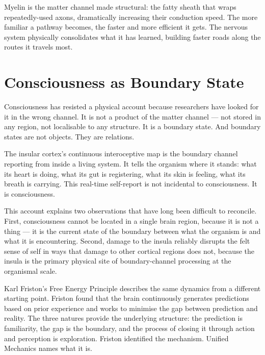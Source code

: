 \documentclass[12pt]{article}
\begin{document}
Myelin is the matter channel made structural: the fatty sheath that wraps
repeatedly-used axons, dramatically increasing their conduction speed. The more
familiar a pathway becomes, the faster and more efficient it gets. The nervous
system physically consolidates what it has learned, building faster roads along
the routes it travels most.

\section{Consciousness as Boundary State}

Consciousness has resisted a physical account because researchers have looked
for it in the wrong channel. It is not a product of the matter channel --- not
stored in any region, not localisable to any structure. It is a boundary state.
And boundary states are not objects. They are relations.

The insular cortex's continuous interoceptive map is the boundary channel
reporting from inside a living system. It tells the organism where it stands:
what its heart is doing, what its gut is registering, what its skin is feeling,
what its breath is carrying. This real-time self-report is not incidental to
consciousness. It is consciousness.

This account explains two observations that have long been difficult to reconcile.
First, consciousness cannot be located in a single brain region, because it is
not a thing --- it is the current state of the boundary between what the organism
is and what it is encountering. Second, damage to the insula reliably disrupts
the felt sense of self in ways that damage to other cortical regions does not,
because the insula is the primary physical site of boundary-channel processing at
the organismal scale.

Karl Friston's Free Energy Principle describes the same dynamics from a different
starting point. Friston found that the brain continuously generates predictions
based on prior experience and works to minimise the gap between prediction and
reality. The three natures provide the underlying structure: the prediction is
familiarity, the gap is the boundary, and the process of closing it through
action and perception is exploration. Friston identified the mechanism. Unified
Mechanics names what it is.

\end{document}
